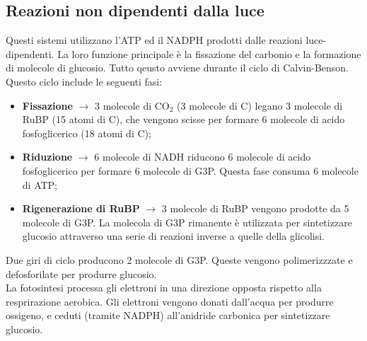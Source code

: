 \subsection{Reazioni non dipendenti dalla luce}
Questi sistemi utilizzano l'ATP ed il NADPH prodotti dalle reazioni luce-dipendenti. La loro funzione principale \`e la fissazione del carbonio e la formazione di molecole di glucosio. Tutto qeusto avviene durante il ciclo di Calvin-Benson. Questo ciclo include le seguenti fasi:
\begin{itemize}
    \item \textbf{Fissazione} $\xrightarrow{}$ 3 molecole di CO$_2$ (3 molecole di C) legano 3 molecole di RuBP (15 atomi di C), che vengono scisse per formare 6 molecole di acido fosfoglicerico (18 atomi di C);
    \item \textbf{Riduzione} $\xrightarrow{}$ 6 molecole di NADH riducono 6 molecole di acido fosfoglicerico per formare 6 molecole di G3P. Questa fase consuma 6 molecole di ATP;
    \item \textbf{Rigenerazione di RuBP} $\xrightarrow{}$ 3 molecole di RuBP vengono prodotte da 5 molecole di G3P. La molecola di G3P rimanente \`e utilizzata per sintetizzare glucosio attraverso una serie di reazioni inverse a quelle della glicolisi.
\end{itemize}
Due giri di ciclo producono 2 molecole di G3P. Queste vengono polimerizzzate e defosforilate per produrre glucosio. 
\\La fotosintesi processa gli elettroni in una direzione opposta rispetto alla resprirazione aerobica. Gli elettroni vengono donati dall'acqua per produrre ossigeno, e ceduti (tramite NADPH) all'anidride carbonica per sintetizzare glucosio.
